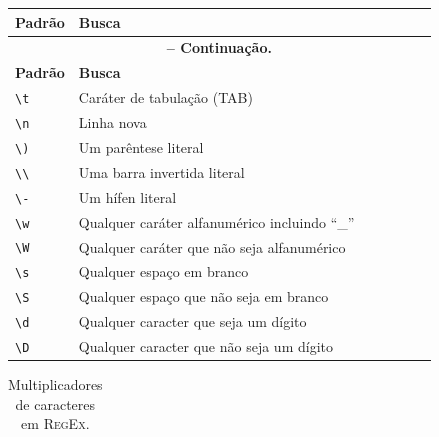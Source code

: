 \begin{refsection}
\begin{center}
\begin{longtable}{lllllll}
\hline\hline \textbf{Padrão} & \textbf{Busca}\\
\endfirsthead

\multicolumn{6}{c}{{\bfseries \tablename\ \thetable{} -- Continuação.}}\\
\hline\hline \textbf{Padrão} & \textbf{Busca}\\
\endhead
\hline \hline
\endlastfoot
\texttt{\textbackslash t} & Caráter de tabulação (\textsc{TAB})\\
\texttt{\textbackslash n} & Linha nova\\
\texttt{\textbackslash )} & Um parêntese literal\\
\texttt{\textbackslash \textbackslash} & Uma barra invertida literal\\
\texttt{\textbackslash -} & Um hífen literal\\
\texttt{\textbackslash w} & Qualquer caráter alfanumérico incluindo ``\_''\\
\texttt{\textbackslash W} & Qualquer caráter que não seja alfanumérico\\
\texttt{\textbackslash s} & Qualquer espaço em branco\\
\texttt{\textbackslash S} & Qualquer espaço que não seja em branco\\
\texttt{\textbackslash d} & Qualquer caracter que seja um dígito\\
\texttt{\textbackslash D} & Qualquer caracter que não seja um dígito\\

\end{longtable}
\end{center}


\pagestyle{fancy}
\begin{center}

\begin{longtable}{lllllll}
\caption[Tabela \ref{tut2:table:multiple}:Multiplicadores em \textsc{RegEx}]{Multiplicadores de caracteres em \textsc{RegEx}.} \label{tut2:table:multiple} \\



\end{longtable}
\end{center}
\end{refsection}
